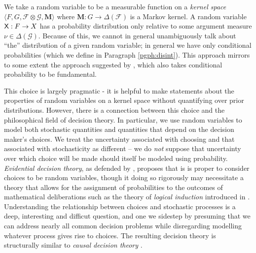 

We take a random variable to be a measurable function on a \emph{kernel space} $\langle F, G, \mathcal{F}\otimes\mathcal{G},\mathbf{M}\rangle$ where $\mathbf{M}:G\to \Delta(\mathcal{F})$ is a Markov kernel. A random variable $\mathsf{X}:F\to X$ has a probability distribution only relative to some argument measure $\nu\in\Delta(\mathcal{G})$. Because of this, we cannot in general unambiguously talk about ``the'' distribution of a given random variable; in general we have only conditional probabilities (which we define in Paragraph \ref{pgph:disint}). This approach mirrors to some extent the approach suggested by \citet{hajek_what_2003}, which also takes conditional probability to be fundamental.

This choice is largely pragmatic - it is helpful to make statements about the properties of random variables on a kernel space without quantifying over prior distributions. However, there is a connection between this choice and the philosophical field of decision theory. In particular, we use random variables to model both stochastic quantities and quantities that depend on the decision maker's choices. We treat the uncertainty associated with choosing and that associated with stochasticity as different -- we do \emph{not} suppose that uncertainty over which choice will be made should itself be modeled using probability. \emph{Evidential decision theory}, as defended by \citet{jeffrey_logic_1981}, proposes that is is proper to consider choices to be random variables, though it  doing so rigorously may necessitate a theory that allows for the assignment of probabilities to the outcomes of mathematical deliberations such as the theory of \emph{logical induction} introduced in \citet{garrabrant_logical_2017}. Understanding the relationship between choices and stochastic processes is a deep, interesting and difficut question, and one we sidestep by presuming that we can address nearly all common decision problems while disregarding modelling whatever process gives rise to choices. The resulting decision theory is structurally similar to \emph{causal decision theory} \citep{lewis_causal_1981}.

